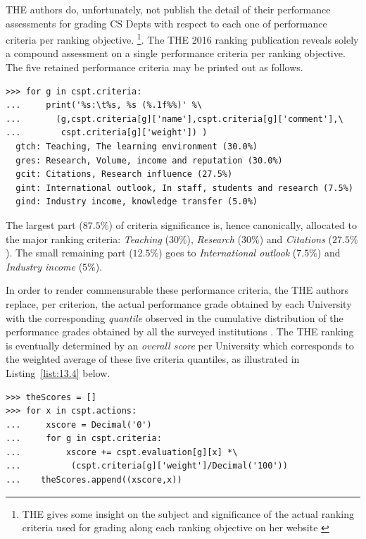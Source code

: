 THE authors do, unfortunately, not publish the detail of their performance assessments for grading CS Depts with respect to each one of performance criteria per ranking objective.  \footnote{THE gives some insight on the subject and significance of the actual ranking criteria used for grading along each ranking objective on her website \citep{THE-2016}}. The THE 2016 ranking publication reveals solely a compound assessment on a single performance criteria per ranking objective. The five retained performance criteria may be printed out as follows.
\begin{lstlisting}
>>> for g in cspt.criteria:
...     print('%s:\t%s, %s (%.1f%%)' %\
...       (g,cspt.criteria[g]['name'],cspt.criteria[g]['comment'],\
...        cspt.criteria[g]['weight']) )  
  gtch:	Teaching, The learning environment (30.0%)
  gres:	Research, Volume, income and reputation (30.0%)
  gcit:	Citations, Research influence (27.5%)
  gint:	International outlook, In staff, students and research (7.5%)
  gind:	Industry income, knowledge transfer (5.0%)
\end{lstlisting}

The largest part ($87.5\%$) of criteria significance is, hence canonically, allocated to the major ranking criteria: \emph{Teaching} ($30\%$), \emph{Research} ($30\%$) and \emph{Citations} ($27.5\%$). The small remaining part ($12.5\%$) goes to \emph{International outlook} ($7.5\%$) and \emph{Industry income} ($5\%$).

In order to render commensurable these performance criteria, the THE authors replace, per criterion, the actual performance grade obtained by each University with the corresponding \emph{quantile} observed in the cumulative distribution of the performance grades obtained by all the surveyed institutions \citep{THE-2016}. The THE ranking is eventually determined by an \emph{overall score} per University which corresponds to the weighted average of these five criteria quantiles, as illustrated in Listing~\vref{list:13.4} below.     
\begin{lstlisting}[caption={Computing the THE overall scores},label=list:13.4]
>>> theScores = []
>>> for x in cspt.actions:
...     xscore = Decimal('0')
...     for g in cspt.criteria:
...         xscore += cspt.evaluation[g][x] *\
...          (cspt.criteria[g]['weight']/Decimal('100'))
...	   theScores.append((xscore,x))
\end{lstlisting}

